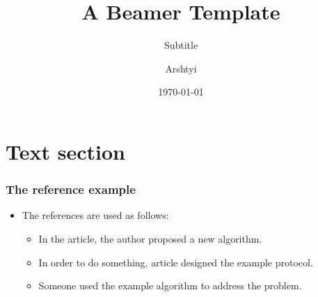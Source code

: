 \documentclass{../../../Cls/SDU/Beamer/Beamer}
\title[Beamer Template]{A Beamer Template}
\subtitle{Subtitle}
\author{Arshtyi}
\institute[SDU] 
{   
	CS\\ %
	\medskip %
	\textit{\url{arshtyi_trantor@outlook.com}} %
}
\date{\today}
\begin{document}
\begin{frame}
    \titlepage %
\end{frame}


\section{Text section} %

\begin{frame}
    \frametitle{The reference example} %
    \begin{itemize}
        \item The references are used as follows:
              \begin{itemize}
                  \item In the article, the author proposed a new algorithm.
                  \item In order to do something, article designed the example protocol.
                  \item Someone used the example algorithm to address the problem.
              \end{itemize}
    \end{itemize}
\end{frame}
\end{document}
